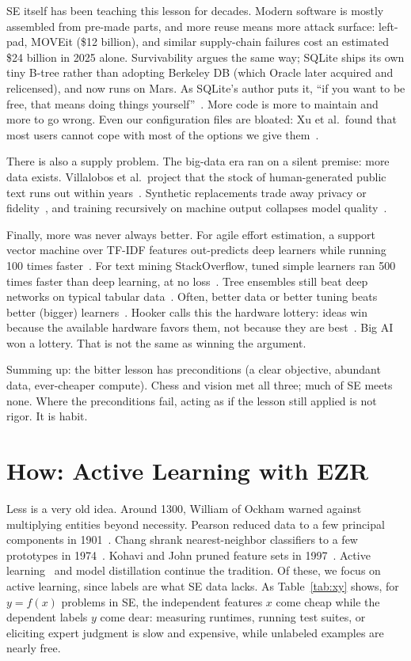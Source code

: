 \documentclass[10pt,conference]{IEEEtran}
\begin{document}
SE itself has been teaching this lesson for decades. Modern software
is mostly assembled from pre-made parts, and more reuse means more
attack surface: left-pad, MOVEit (\$12 billion), and similar
supply-chain failures cost an estimated \$24 billion in 2025 alone.
Survivability argues the same way; SQLite ships its own tiny B-tree
rather than adopting Berkeley DB (which Oracle later acquired and
relicensed), and now runs on Mars. As SQLite's author puts it, ``if
you want to be free, that means doing things
yourself''~\cite{hipp21}. More code
is more to maintain and more to go wrong. Even our configuration
files are bloated: Xu et al.\ found that most users cannot cope with
most of the options we give them~\cite{xu15}.

There is also a supply problem. The big-data era ran on a silent
premise: more data exists. Villalobos et
al.\ project that the stock of human-generated public text runs out
within years~\cite{villalobos24}. Synthetic replacements trade away
privacy or fidelity~\cite{ling24}, and training recursively on
machine output collapses model quality~\cite{shumailov24}.

Finally, more was never always better. For agile effort estimation, a
support vector machine over TF-IDF features out-predicts deep learners
while running 100 times faster~\cite{tawosi23}. For text mining
StackOverflow, tuned simple learners ran 500 times faster than deep
learning, at no loss~\cite{majumder18}. Tree ensembles still beat deep
networks on typical tabular data~\cite{grinsztajn22}.
Often, better data or better tuning beats better (bigger)
learners~\cite{agrawal18, fu16, fu17}. Hooker calls this the hardware
lottery: ideas win because the available hardware favors them, not
because they are best~\cite{hooker21}. Big AI won a lottery. That is
not the same as winning the argument.

Summing up: the bitter lesson has preconditions (a clear objective,
abundant data, ever-cheaper compute). Chess and vision met all three;
much of SE meets none. Where the preconditions fail, acting as if the
lesson still applied is not rigor. It is habit.

\section{How: Active Learning with EZR}
\label{sec:how}
Less is a very old idea. Around
1300, William of Ockham warned against multiplying entities beyond
necessity. Pearson reduced data to a few principal components in
1901~\cite{pearson01}. Chang shrank nearest-neighbor classifiers to a
few prototypes in 1974~\cite{chang74}. Kohavi and John pruned feature
sets in 1997~\cite{kohavi97}. Active learning~\cite{settles09} and
model distillation continue the tradition. Of these, we focus on
active learning,
since labels are what SE data lacks. As Table~\ref{tab:xy} shows, for
$y=f(x)$ problems in SE, the independent features $x$ come cheap
while the dependent labels $y$ come dear: measuring runtimes, running
test suites, or eliciting expert judgment is slow and expensive,
while unlabeled examples are nearly free.
\end{document}
